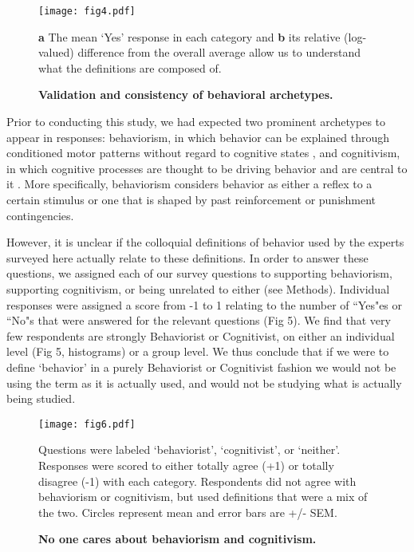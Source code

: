 \documentclass[a4paper, 11pt]{article}
\begin{document}
\begin{figure}
\centerline{\texttt{[image: fig4.pdf]}}
\caption{\textbf{Validation and consistency of behavioral archetypes.}} \textbf{a} The mean `Yes' response in each category and \textbf{b} its relative (log-valued) difference from the overall average allow us to understand what the definitions are composed of.
\end{figure}

Prior to conducting this study, we had expected two prominent archetypes to appear in responses: behaviorism, in which behavior can be explained through conditioned motor patterns without regard to cognitive states \cite{skinner1986behaviorism, skinner2011behaviorism}, and cognitivism, in which cognitive processes are thought to be driving behavior and are central to it \cite{haugeland1978nature}. More specifically, behaviorism \cite{skinner1986behaviorism, skinner2011behaviorism} considers behavior as either a reflex to a certain stimulus \cite{dewey1896reflex} or one that is shaped by past reinforcement or punishment contingencies.

However, it is unclear if the colloquial definitions of behavior used by the experts surveyed here actually relate to these definitions. In order to answer these questions, we assigned each of our survey questions to supporting behaviorism, supporting cognitivism, or being unrelated to either (see Methods). Individual responses were assigned a score from -1 to 1 relating to the number of ``Yes"es or ``No"s that were answered for the relevant questions (Fig 5). We find that very few respondents are strongly Behaviorist or Cognitivist, on either an individual level (Fig 5, histograms) or a group level. We thus conclude that if we were to define `behavior' in a purely Behaviorist or Cognitivist fashion we would not be using the term as it is actually used, and would not be studying what is actually being studied.

\begin{figure}
\centerline{\texttt{[image: fig6.pdf]}}
\caption{\textbf{No one cares about behaviorism and cognitivism.}} Questions were labeled `behaviorist', `cognitivist', or `neither'. Responses were scored to either totally agree (+1) or totally disagree (-1) with each category. Respondents did not agree with behaviorism or cognitivism, but used definitions that were a mix of the two. Circles represent mean and error bars are +/- SEM.
\end{figure}
\end{document}
